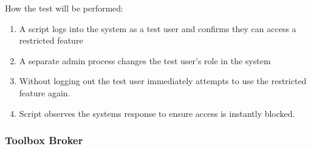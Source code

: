\documentclass[12pt, titlepage]{article}
\begin{document}
\begin{enumerate}
  How the test will be performed:
  \begin{enumerate}
    \item A script logs into the system as a test user and confirms they can access a restricted feature
    \item A separate admin process changes the test user's role in the system
    \item Without logging out the test user immediately attempts to use the restricted feature again.
    \item Script observes the systems response to ensure access is instantly blocked.
  \end{enumerate}
\end{enumerate}

\subsubsection{Toolbox Broker}
\end{document}
